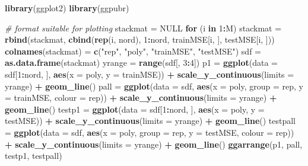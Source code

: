 \documentclass[]{article}
\newenvironment{Shaded}{\begin{snugshade}}{\end{snugshade}}
\newcommand{\CommentTok}[1]{\textcolor[rgb]{0.56,0.35,0.01}{\textit{#1}}}
\newcommand{\ControlFlowTok}[1]{\textcolor[rgb]{0.13,0.29,0.53}{\textbf{#1}}}
\newcommand{\DataTypeTok}[1]{\textcolor[rgb]{0.13,0.29,0.53}{#1}}
\newcommand{\DecValTok}[1]{\textcolor[rgb]{0.00,0.00,0.81}{#1}}
\newcommand{\KeywordTok}[1]{\textcolor[rgb]{0.13,0.29,0.53}{\textbf{#1}}}
\newcommand{\NormalTok}[1]{#1}
\newcommand{\OperatorTok}[1]{\textcolor[rgb]{0.81,0.36,0.00}{\textbf{#1}}}
\newcommand{\OtherTok}[1]{\textcolor[rgb]{0.56,0.35,0.01}{#1}}
\newcommand{\StringTok}[1]{\textcolor[rgb]{0.31,0.60,0.02}{#1}}
\begin{document}
\begin{Shaded}
\begin{Highlighting}[]
\KeywordTok{library}\NormalTok{(ggplot2)}
\KeywordTok{library}\NormalTok{(ggpubr)}

\CommentTok{# format suitable for plotting}
\NormalTok{stackmat =}\StringTok{ }\OtherTok{NULL}
\ControlFlowTok{for}\NormalTok{ (i }\ControlFlowTok{in} \DecValTok{1}\OperatorTok{:}\NormalTok{M) stackmat =}\StringTok{ }\KeywordTok{rbind}\NormalTok{(stackmat, }\KeywordTok{cbind}\NormalTok{(}\KeywordTok{rep}\NormalTok{(i, nord), }\DecValTok{1}\OperatorTok{:}\NormalTok{nord, }
\NormalTok{    trainMSE[i, ], testMSE[i, ]))}
\KeywordTok{colnames}\NormalTok{(stackmat) =}\StringTok{ }\KeywordTok{c}\NormalTok{(}\StringTok{"rep"}\NormalTok{, }\StringTok{"poly"}\NormalTok{, }\StringTok{"trainMSE"}\NormalTok{, }\StringTok{"testMSE"}\NormalTok{)}
\NormalTok{sdf =}\StringTok{ }\KeywordTok{as.data.frame}\NormalTok{(stackmat)}
\NormalTok{yrange =}\StringTok{ }\KeywordTok{range}\NormalTok{(sdf[, }\DecValTok{3}\OperatorTok{:}\DecValTok{4}\NormalTok{])}
\NormalTok{p1 =}\StringTok{ }\KeywordTok{ggplot}\NormalTok{(}\DataTypeTok{data =}\NormalTok{ sdf[}\DecValTok{1}\OperatorTok{:}\NormalTok{nord, ], }\KeywordTok{aes}\NormalTok{(}\DataTypeTok{x =}\NormalTok{ poly, }\DataTypeTok{y =}\NormalTok{ trainMSE)) }\OperatorTok{+}\StringTok{ }\KeywordTok{scale_y_continuous}\NormalTok{(}\DataTypeTok{limits =}\NormalTok{ yrange) }\OperatorTok{+}\StringTok{ }
\StringTok{    }\KeywordTok{geom_line}\NormalTok{()}
\NormalTok{pall =}\StringTok{ }\KeywordTok{ggplot}\NormalTok{(}\DataTypeTok{data =}\NormalTok{ sdf, }\KeywordTok{aes}\NormalTok{(}\DataTypeTok{x =}\NormalTok{ poly, }\DataTypeTok{group =}\NormalTok{ rep, }\DataTypeTok{y =}\NormalTok{ trainMSE, }\DataTypeTok{colour =}\NormalTok{ rep)) }\OperatorTok{+}\StringTok{ }
\StringTok{    }\KeywordTok{scale_y_continuous}\NormalTok{(}\DataTypeTok{limits =}\NormalTok{ yrange) }\OperatorTok{+}\StringTok{ }\KeywordTok{geom_line}\NormalTok{()}
\NormalTok{testp1 =}\StringTok{ }\KeywordTok{ggplot}\NormalTok{(}\DataTypeTok{data =}\NormalTok{ sdf[}\DecValTok{1}\OperatorTok{:}\NormalTok{nord, ], }\KeywordTok{aes}\NormalTok{(}\DataTypeTok{x =}\NormalTok{ poly, }\DataTypeTok{y =}\NormalTok{ testMSE)) }\OperatorTok{+}\StringTok{ }\KeywordTok{scale_y_continuous}\NormalTok{(}\DataTypeTok{limits =}\NormalTok{ yrange) }\OperatorTok{+}\StringTok{ }
\StringTok{    }\KeywordTok{geom_line}\NormalTok{()}
\NormalTok{testpall =}\StringTok{ }\KeywordTok{ggplot}\NormalTok{(}\DataTypeTok{data =}\NormalTok{ sdf, }\KeywordTok{aes}\NormalTok{(}\DataTypeTok{x =}\NormalTok{ poly, }\DataTypeTok{group =}\NormalTok{ rep, }\DataTypeTok{y =}\NormalTok{ testMSE, }
    \DataTypeTok{colour =}\NormalTok{ rep)) }\OperatorTok{+}\StringTok{ }\KeywordTok{scale_y_continuous}\NormalTok{(}\DataTypeTok{limits =}\NormalTok{ yrange) }\OperatorTok{+}\StringTok{ }\KeywordTok{geom_line}\NormalTok{()}
\KeywordTok{ggarrange}\NormalTok{(p1, pall, testp1, testpall)}
\end{Highlighting}
\end{Shaded}
\end{document}

